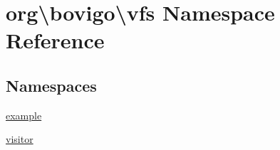 \hypertarget{namespaceorg_1_1bovigo_1_1vfs}{}\section{org\textbackslash{}bovigo\textbackslash{}vfs Namespace Reference}
\label{namespaceorg_1_1bovigo_1_1vfs}
\subsection*{Namespaces}
\begin{DoxyCompactItemize}
\item 
 \mbox{\hyperlink{namespaceorg_1_1bovigo_1_1vfs_1_1example}{example}}
\item 
 \mbox{\hyperlink{namespaceorg_1_1bovigo_1_1vfs_1_1visitor}{visitor}}
\end{DoxyCompactItemize}
